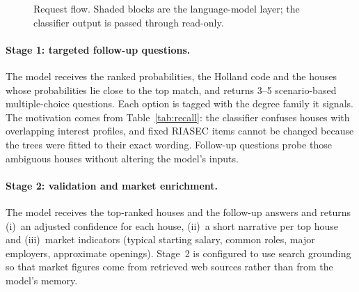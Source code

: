 \begin{figure}[h]
\centering
{}
\caption{Request flow. Shaded blocks are the language-model layer; the
         classifier output is passed through read-only.}
\label{fig:flow}
\end{figure}

\paragraph{Stage 1: targeted follow-up questions.}
The model receives the ranked probabilities, the Holland code and the houses
whose probabilities lie close to the top match, and returns 3--5
scenario-based multiple-choice questions. Each option is tagged with the
degree family it signals. The motivation comes from Table~\ref{tab:recall}: the classifier
confuses houses with overlapping interest profiles, and fixed RIASEC items
cannot be changed because the trees were fitted to their exact wording.
Follow-up questions probe those ambiguous houses without altering the
model's inputs.

\paragraph{Stage 2: validation and market enrichment.}
The model receives the top-ranked houses and the follow-up answers and
returns (i)~an adjusted confidence for each house, (ii)~a short narrative per
top house and (iii)~market indicators (typical starting salary, common roles,
major employers, approximate openings). Stage~2 is configured to use search
grounding so that market figures come from retrieved web sources rather than
from the model's memory.

